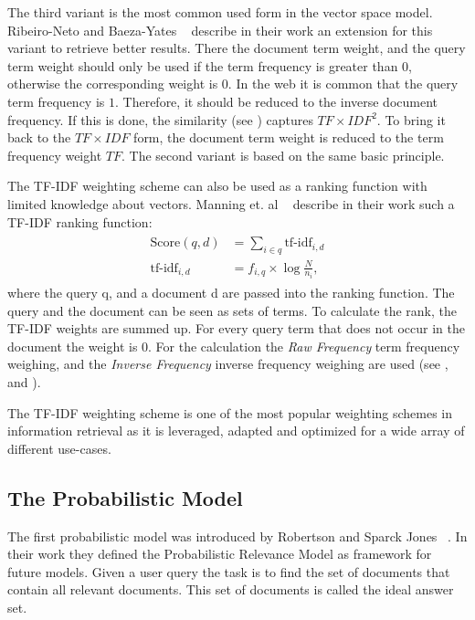 The third variant is the most common used form in the vector space model. Ribeiro-Neto and Baeza-Yates ~\cite{ModernInvormationRetrieval1999} describe in their work an extension for this variant to retrieve better results. There the document term weight, and the query term weight should only be used if the term frequency is greater than $0$, otherwise the corresponding weight is $0$. In the web it is common that the query term frequency is $1$. Therefore, it should be reduced to the inverse document frequency. If this is done, the similarity (see ) captures $TF \times IDF^2$. To bring it back to the $TF \times IDF$ form, the document term weight is reduced to the term frequency weight $TF$. The second variant is based on the same basic principle.

The TF-IDF weighting scheme can also be used as a ranking function with limited knowledge about vectors. Manning et. al ~\cite{manning2008} describe in their work such a TF-IDF ranking function:
\begin{align}
  \begin{split}
    \text{Score}(q, d) & = \sum_{i \in q} \text{tf-idf}_{i, d} \\
    \text{tf-idf}_{i, d} & = f_{i, q} \times \log \frac{N}{n_i},
  \end{split}
\end{align}
where the query q, and a document d are passed into the ranking function. The query and the document can be seen as sets of terms. To calculate the rank, the TF-IDF weights are summed up. For every query term that does not occur in the document the weight is $0$. For the calculation the \textit{Raw Frequency} term frequency weighing, and the \textit{Inverse Frequency} inverse frequency weighing are used (see , and ).

The TF-IDF weighting scheme is one of the most popular weighting schemes in information retrieval as it is leveraged, adapted and optimized for a wide array of different use-cases.

\subsection{The Probabilistic Model}
\label{sec:the_probabilistic_model}

The first probabilistic model was introduced by Robertson and Sparck Jones ~\cite{Robertson1976}. In their work they defined the Probabilistic Relevance Model as framework for future models. Given a user query the task is to find the set of documents that contain all relevant documents. This set of documents is called the ideal answer set. 

